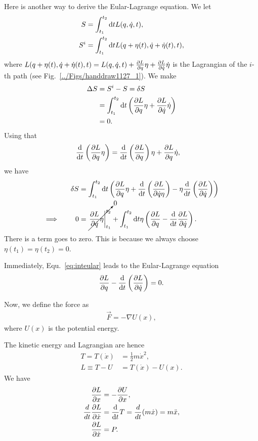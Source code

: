 Here is another way to derive the Eular-Lagrange equation. We let 
\begin{align}
S &=\int_{t_1}^{t_2} \mathrm{d} t L(q,\dot{q},t),\\
S^i &= \int_{t_1}^{t_2} \mathrm{d} t L(q+\eta(t),\dot{q}+\dot{\eta}(t),t),
\end{align}
where $ L(q+\eta(t),\dot{q}+\dot{\eta}(t),t)=L(q,\dot{q},t)+\frac{\partial {L}}{\partial {q}}\eta+\frac{\partial {L}}{\partial {\dot{q}}}\dot{\eta} $ is the Lagrangian of the $ i $-th path (see Fig.~\ref{../Figs/handdraw1127_1}). We make 
\begin{align}
\Delta S &=S^i-S=\delta S\\
&= \int_{t_1}^{t_2} \mathrm{d} t \left( \frac{\partial {L}}{\partial {q}}\eta+\frac{\partial {L}}{\partial {\dot{q}}}\dot{\eta} \right)\\
&= 0. 
\end{align}
Using that \begin{align}
\frac{{\mathrm d} {}}{{\mathrm d}t} \left( \frac{\partial {L}}{\partial {q}}\eta \right) &= \frac{{\mathrm d} {}}{{\mathrm d}t} \left( \frac{\partial {L}}{\partial {q}} \right) \eta + \frac{\partial {L}}{\partial {q}}\dot{\eta},
\end{align}
we have
\begin{align}
\delta S &= \int_{t_1}^{t_2} \mathrm{d} t \left( \frac{\partial {L}}{\partial {q}}\eta + \frac{{\mathrm d} {}}{{\mathrm d}t}\left( \frac{\partial {L}}{\partial {\dot{q} \eta}} \right)-\eta \frac{{\mathrm d} {}}{{\mathrm d}t}\left(\frac{\partial {L}}{\partial {\dot{q}}} \right) \right)\\
\implies \qquad 0 &= \cancelto{0}{\left. \frac{\partial {L}}{\partial {\dot{q}}} \eta\right|_{t_1}^{t_2}  } + \int_{t_1}^{t_2} \mathrm{d} t \eta \left(\frac{\partial {L}}{\partial {q}}-\frac{{\mathrm d} {}}{{\mathrm d}t}\frac{\partial {L}}{\partial {\dot{q}}} \right).\label{eq:inteular}
\end{align}
There is a term goes to zero. This is because we always choose $ \eta(t_1)=\eta(t_2)=0 $. 

Immediately, Equ.~\eqref{eq:inteular} leads to the Eular-Lagrange equation
\begin{align}
\frac{\partial {L}}{\partial {q}} - \frac{{\mathrm d} {}}{{\mathrm d}t} \left(\frac{\partial {L}}{\partial {\dot{q}}} \right)=0.
\end{align}

Now, we define the force as
\begin{align}
\vec{F}
=- \nabla U(x),
\end{align}
where $ U(x) $ is the potential energy. 

The kinetic energy and Lagrangian are hence
\begin{align}
T =T(\dot{x}) &= \frac{1}{2} m\dot{x}^2,\\
L \equiv T-U &=T(\dot{x})-U(x).
\end{align}
We have
\begin{align}
\frac{\partial L}{\partial x} &= - \frac{\partial U}{\partial x},\\
\frac{d}{dt} \frac{\partial L}{\partial \dot{x}} &= \frac{{\mathrm d} {}}{{\mathrm d}t}  T= \frac{d}{dt} (m\dot{x}) = m\ddot{x},\\
\frac{\partial L}{\partial \dot{x}} &= P.
\end{align}

